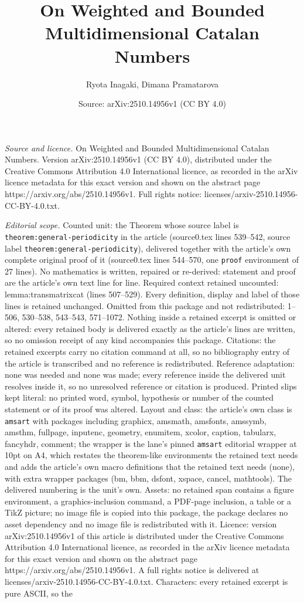 \documentclass[10pt,a4paper]{amsart}
\title[On Weighted and Bounded Multidimensional Catalan Numbers]{On Weighted and Bounded Multidimensional Catalan Numbers}
\author{Ryota Inagaki, Dimana Pramatarova}
\date{Source: arXiv:2510.14956v1 (CC BY 4.0)}
\begin{document}
\maketitle

\noindent\emph{Source and licence.} On Weighted and Bounded Multidimensional Catalan Numbers. Version arXiv:2510.14956v1 (CC BY 4.0), distributed under the Creative Commons Attribution 4.0 International licence, as recorded in the arXiv licence metadata for this exact version and shown on the abstract page https://arxiv.org/abs/2510.14956v1. Full rights notice: licenses/arxiv-2510.14956-CC-BY-4.0.txt.\par\smallskip

\noindent\textit{Editorial scope.} Counted unit: the Theorem whose source label is \texttt{theorem:general-periodicity} in the article (source0.tex lines 539--542, source label \texttt{theorem:general-periodicity}), delivered together with the article's own complete original proof of it (source0.tex lines 544--570, one \texttt{proof} environment of 27 lines). No mathematics is written, repaired or re-derived: statement and proof are the article's own text line for line. Required context retained uncounted: lemma:transmatrixcat (lines 507--529). Every definition, display and label of those lines is retained unchanged. Omitted from this package and not redistributed: 1--506, 530--538, 543--543, 571--1072. Nothing inside a retained excerpt is omitted or altered: every retained body is delivered exactly as the article's lines are written, so no omission receipt of any kind accompanies this package. Citations: the retained excerpts carry no citation command at all, so no bibliography entry of the article is transcribed and no reference is redistributed. Reference adaptation: none was needed and none was made; every reference inside the delivered unit resolves inside it, so no unresolved reference or citation is produced. Printed slips kept literal: no printed word, symbol, hypothesis or number of the counted statement or of its proof was altered. Layout and class: the article's own class is \texttt{amsart} with packages including graphicx, amsmath, amsfonts, amssymb, amsthm, fullpage, inputenc, geometry, enumitem, xcolor, caption, tabularx, fancyhdr, comment; the wrapper is the lane's pinned \texttt{amsart} editorial wrapper at 10pt on A4, which restates the theorem-like environments the retained text needs and adds the article's own macro definitions that the retained text needs (none), with extra wrapper packages (bm, bbm, dsfont, xspace, cancel, mathtools). The delivered numbering is the unit's own. Assets: no retained span contains a figure environment, a graphics-inclusion command, a PDF-page inclusion, a table or a TikZ picture; no image file is copied into this package, the package declares no asset dependency and no image file is redistributed with it. Licence: version arXiv:2510.14956v1 of this article is distributed under the Creative Commons Attribution 4.0 International licence, as recorded in the arXiv licence metadata for this exact version and shown on the abstract page https://arxiv.org/abs/2510.14956v1. A full rights notice is delivered at licenses/arxiv-2510.14956-CC-BY-4.0.txt. Characters: every retained excerpt is pure ASCII, so the 
\end{document}
